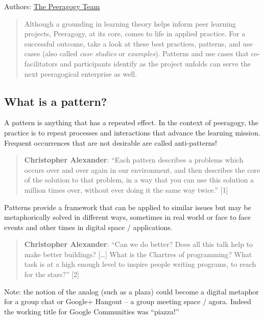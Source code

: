 Authors: \href{http://peeragogy.org/resources/meet-the-team/}{The
Peeragogy Team}

\begin{quote}
Although a grounding in learning theory helps inform peer learning
projects, Peeragogy, at its core, comes to life in applied practice. For
a successful outcome, take a look at these best practices, patterns, and
use cases (also called \emph{case studies} or \emph{examples}). Patterns
and use cases that co-facilitators and participants identify as the
project unfolds can serve the next peeragogical enterprise as well.

\end{quote}
\subsection{}

\subsection{What is a pattern?}

A pattern is anything that has a repeated effect. In the context of
peeragogy, the practice is to repeat processes and interactions that
advance the learning mission. Frequent occurrences that are not
desirable are called anti-patterns!

\begin{quote}
\textbf{Christopher Alexander}: ``Each pattern describes a problems
which occurs over and over again in our environment, and then describes
the core of the solution to that problem, in a way that you can use this
solution a million times over, without ever doing it the same way
twice.'' {[}1{]}

\end{quote}
Patterns provide a framework that can be applied to similar issues but
may be metaphorically solved in different ways, sometimes in real world
or face to face events and other times in digital space / applications.

\begin{quote}
\textbf{Christopher Alexander}: ``Can we do better? Does all this talk
help to make better buildings? {[}\ldots{}{]} What is the Chartres of
programming? What task is at a high enough level to inspire people
writing programs, to reach for the stars?'' {[}2{]}

\end{quote}
Note: the notion of the analog (such as a plaza) could become a digital
metaphor for a group chat or Google+ Hangout -- a group meeting space /
agora. Indeed the working title for Google Communities was ``piazza!''

